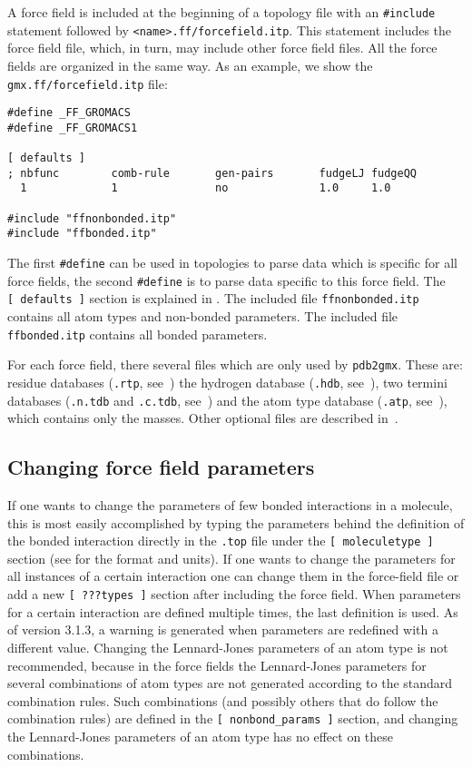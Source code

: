 A force field is included at the beginning of a topology file with an
{\tt \#include} statement followed by {\tt <name>.ff/forcefield.itp}.
This statement includes the force field file,
which, in turn, may include other force field files. All the force fields
are organized in the same way. As an example, we show the {\tt gmx.ff/forcefield.itp}
file:

{\small
\begin{verbatim}
#define _FF_GROMACS
#define _FF_GROMACS1

[ defaults ]
; nbfunc        comb-rule       gen-pairs       fudgeLJ fudgeQQ
  1             1               no              1.0     1.0

#include "ffnonbonded.itp"
#include "ffbonded.itp"
\end{verbatim}}

The first {\tt \#define} can be used in topologies to parse data which is
specific for all {\gromacs} force fields, the second {\tt \#define} is to parse
data specific to this force field. The {\tt [~defaults~]} section is
explained in . The included file {\tt ffnonbonded.itp} contains
all atom types and non-bonded parameters. The included file {\tt ffbonded.itp}
contains all bonded parameters.

For each force field, there several files which are only used by {\tt pdb2gmx}.
These are: residue databases ({\tt .rtp}, see~)
the hydrogen database ({\tt .hdb}, see~), two termini databases
({\tt .n.tdb} and {\tt .c.tdb}, see~) and
the atom type database ({\tt .atp}, see~), which contains only the masses.  Other optional
files are described in~.


\subsection{Changing force field parameters}
If one wants to change the parameters of few bonded interactions in
a molecule, this is most easily accomplished by typing the parameters
behind the definition of the bonded interaction directly in the {\tt *.top} file 
under the {\tt [~moleculetype~]} section (see  for the format
and units).
If one wants to change the parameters for all instances of a certain
interaction one can change them in the force-field file or add a
new {\tt [~???types~]} section after including the force field.
When parameters for a certain interaction are defined multiple times,
the last definition is used. As of {\gromacs} version 3.1.3, a warning is
generated when parameters are redefined with a different value.
Changing the Lennard-Jones parameters of an atom type is not
recommended, because in the {\gromos} force fields
the Lennard-Jones parameters for several combinations of atom types
are not generated according to the standard combination rules.
Such combinations (and possibly others that do follow the
combination rules) are defined in the {\tt [~nonbond_params~]}
section, and changing the Lennard-Jones parameters of an atom type
has no effect on these combinations.

